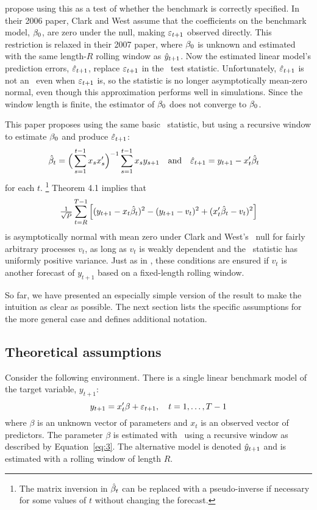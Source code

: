 \citet{ClW:06,ClW:07} propose using this as a test of whether the benchmark is correctly specified.
In their 2006 paper, Clark and West assume that the
coefficients on the benchmark model, $\btrue$, are zero under the null, making
$\varepsilon_{t+1}$ observed directly. This restriction is relaxed in
their 2007 paper, where $\btrue$ is unknown and estimated with the same length-$R$
rolling window as $\hat{y}_{t+1}$. Now the estimated linear model's prediction errors,
$\hat{\varepsilon}_{t+1}$, replace $\varepsilon_{t+1}$ in the \oos\
test statistic. Unfortunately, $\hat{\varepsilon}_{t+1}$ is not an
\mds\ even when $\varepsilon_{t+1}$ is, so the statistic is no longer
asymptotically mean-zero normal, even though this approximation
performs well in simulations. Since the window length is finite,
the estimator of $\btrue$ does not converge to $\btrue$.

This paper proposes using the same basic \oos\ statistic,
but using a recursive window to estimate $\btrue$ and produce
$\hat{\varepsilon}_{t+1}$:
\begin{align}
  \label{eq:3}
  \hat{\beta}_t &= \Big(\sum_{s=1}^{t-1} x_{s} x_{s}'\Big)^{-1}
  \sum_{s=1}^{t-1} x_{s} y_{s+1}
  && \text{and}
  &
  \hat{\varepsilon}_{t+1} &= y_{t+1} - x_t'\hat{\beta}_t
\end{align}
for each $t$.%
\footnote{The matrix inversion in $\hat{\beta}_t$ can be replaced with a
  pseudo-inverse if necessary for some values of $t$ without changing
  the forecast.} %
 Theorem 4.1 implies that
\begin{equation*}
  \tfrac{1}{\sqrt{P}} \sum_{t=R}^{T-1} \Big[(y_{t+1} -
  x_t\hat{\beta}_t)^2 - (y_{t+1} - v_t)^2 + (x_t'\hat{\beta}_t - v_t)^2 \Big]
\end{equation*}
is asymptotically normal with mean zero under Clark and West's
\mds\ null for fairly
arbitrary processes $v_t$, as long as $v_t$ is weakly dependent and
the \oos\ statistic has uniformly positive variance.  Just as in
\citet{ClW:06,ClW:07}, these conditions are ensured if $v_t$ is
another forecast of $y_{t+1}$ based on a fixed-length rolling window.

So far, we have presented an especially simple version of the result
to make the intuition as clear as possible. The next section lists the
specific assumptions for the more general case and defines additional notation.

\subsection{Theoretical assumptions}
\label{sec:1a}

Consider the following environment. There is a single linear
benchmark model of the target variable, $y_{t+1}$:
\begin{equation}\label{eq:4}
  y_{t+1} = x_t'\beta + \varepsilon_{t+1}, \quad t = 1,\dots,T-1
\end{equation}
where $\beta$ is an unknown vector of parameters and $x_t$ is an
observed vector of predictors. The parameter $\beta$ is estimated with
\ols\ using a recursive window as described by Equation~\eqref{eq:3}.
The alternative model is denoted $\hat{y}_{t+1}$ and is estimated with a
rolling window of length $R$.

